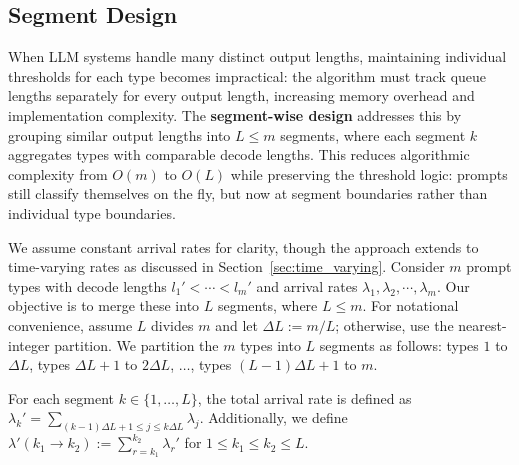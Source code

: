 \subsection{Segment Design}\label{sec:segment_design}

When LLM systems handle many distinct output lengths, maintaining individual thresholds for each type becomes impractical: the algorithm must track queue lengths separately for every output length, increasing memory overhead and implementation complexity. The \textbf{segment-wise design} addresses this by grouping similar output lengths into $L \leq m$ segments, where each segment $k$ aggregates types with comparable decode lengths. This reduces algorithmic complexity from $O(m)$ to $O(L)$ while preserving the threshold logic: prompts still classify themselves on the fly, but now at segment boundaries rather than individual type boundaries.

We assume constant arrival rates for clarity, though the approach extends to time-varying rates as discussed in Section~\ref{sec:time_varying}. Consider $m$ prompt types with decode lengths $l_1' < \cdots < l_m'$ and arrival rates $\lambda_1, \lambda_2, \cdots, \lambda_m$. Our objective is to merge these into $L$ segments, where $L \leq m$. For notational convenience, assume \(L\) divides \(m\) and let $\Delta L:= m/L$; otherwise, use the nearest-integer partition. We partition the $m$ types into $L$ segments as follows: types $1$ to $\Delta L$, types $\Delta L+ 1$ to $2\Delta L$, $\dots$, types $(L-1)\Delta L+ 1$ to $m$.

For each segment $k \in \{1, \dots, L\}$, the total arrival rate is defined as $\lambda_k' = \sum_{(k-1)\Delta L+1\le j\le k\Delta L} \lambda_j$. Additionally, we define $\lambda'(k_1 \to k_2) := \sum_{r=k_1}^{k_2} \lambda_r'$ for $1 \leq k_1 \leq k_2 \leq L$.

